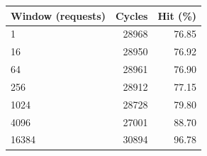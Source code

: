 \begin{tabular}{lrr}
\toprule
Window (requests) & Cycles & Hit (\%) \\
\midrule
1 & 28968 & 76.85 \\
16 & 28950 & 76.92 \\
64 & 28961 & 76.90 \\
256 & 28912 & 77.15 \\
1024 & 28728 & 79.80 \\
4096 & 27001 & 88.70 \\
16384 & 30894 & 96.78 \\
\bottomrule
\end{tabular}
